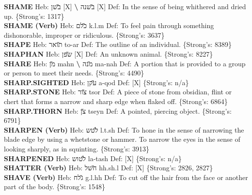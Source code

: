 {\textbf{SHAME} Heb: {\large\H בשן} {[}X{]} \textbf{\textbackslash{}} {\large\H בשנה} {[}X{]} Def: In the sense of being whithered and dried up. \{Strong's: 1317\}\hfill{}\\

\textbf{SHAME (Verb)} Heb: {\large\H כלם} k.l.m Def: To feel pain through something dishonorable, improper or ridiculous. \{Strong's: 3637\}\hfill{}\\

\textbf{SHAPE} Heb: {\large\H תואר} to-ar Def: The outline of an individual. \{Strong's: 8389\}\hfill{}\\

\textbf{SHAPHAN} Heb: {\large\H שפן} {[}X{]} Def: An unknown animal. \{Strong's: 8227\}\hfill{}\\

\textbf{SHARE} Heb: {\large\H מן} mahn \textbf{\textbackslash{}} {\large\H מנה} ma-nah Def: A portion that is provided to a group or person to meet their needs. \{Strong's: 4490\}\hfill{}\\

\textbf{SHARP.SIGHTED} Heb: {\large\H עקן} a-qod Def: {[}X{]} \{Strong's: n/a\}\hfill{}\\

\textbf{SHARP.STONE} Heb: {\large\H צור} tsor Def: A piece of stone from obsidian, flint or chert that forms a narrow and sharp edge when flaked off. \{Strong's: 6864\}\hfill{}\\

\textbf{SHARP.THORN} Heb: {\large\H צן} tseyn Def: A pointed, piercing object. \{Strong's: 6791\}\hfill{}\\

\textbf{SHARPEN (Verb)} Heb: {\large\H לטש} l.t.sh Def: To hone in the sense of narrowing the blade edge by using a whetstone or hammer. To narrow the eyes in the sense of looking sharply, as in squinting. \{Strong's: 3913\}\hfill{}\\

\textbf{SHARPENED} Heb: {\large\H לטוש} la-tash Def: {[}X{]} \{Strong's: n/a\}\hfill{}\\

\textbf{SHATTER (Verb)} Heb: {\large\H חשל} hh.sh.l Def: {[}X{]} \{Strong's: 2826, 2827\}\hfill{}\\

\textbf{SHAVE (Verb)} Heb: {\large\H גלח} g.l.hh Def: To cut off the hair from the face or another part of the body. \{Strong's: 1548\}\hfill{}\\

}
